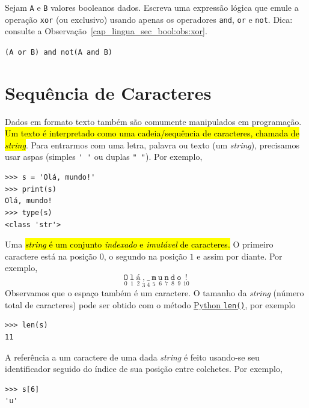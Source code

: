 \begin{exer}\label{cap_lingua_sec_bool:exer:xor}
  Sejam \lstinline+A+ e \lstinline+B+ valores booleanos dados. Escreva uma expressão lógica que emule a operação \lstinline+xor+ (ou exclusivo) usando apenas os operadores \lstinline+and+, \lstinline+or+ e \lstinline+not+. Dica: consulte a Observação~\ref{cap_lingua_sec_bool:obs:xor}.
\end{exer}
\begin{resp}
  \lstinline+(A or B) and not(A and B)+
\end{resp}

\section{Sequência de Caracteres}\label{cap_lingua_sec_string}

Dados em formato texto também são comumente manipulados em programação. \hl{Um texto é interpretado como uma cadeia/sequência de caracteres, chamada de \emph{\textit{string}}}. Para entrarmos com uma letra, palavra ou texto (um \textit{string}), precisamos usar aspas (simples \lstinline+' '+ ou duplas \lstinline+" "+). Por exemplo,
\begin{lstlisting}
>>> s = 'Olá, mundo!'
>>> print(s)
Olá, mundo!
>>> type(s)
<class 'str'>
\end{lstlisting}

Uma \hl{\textit{string} é um conjunto \emph{indexado} e \emph{imutável} de caracteres.} O primeiro caractere está na posição $0$, o segundo na posição $1$ e assim por diante. Por exemplo,
\begin{equation}
  \underset{0}{\texttt{O}}~\underset{1}{\texttt{l}}~\underset{2}{\texttt{á}}~\underset{3}{\texttt{,}}~\underset{4}{\texttt{\_}}~\underset{5}{\texttt{m}}~\underset{6}{\texttt{u}}~\underset{7}{\texttt{n}}~\underset{8}{\texttt{d}}~\underset{9}{\texttt{o}}~\underset{10}{\texttt{!}}
\end{equation}
Observamos que o espaço também é um caractere. O tamanho da \textit{string} (número total de caracteres) pode ser obtido com o método \href{https://docs.python.org/3/library/functions.html?highlight=len#len}{Python \lstinline+len()+}, por exemplo
\begin{lstlisting}
>>> len(s)
11
\end{lstlisting}
A referência a um caractere de uma dada \textit{string} é feito usando-se seu identificador seguido do índice de sua posição entre colchetes. Por exemplo,
\begin{lstlisting}
>>> s[6]
'u'
\end{lstlisting}

